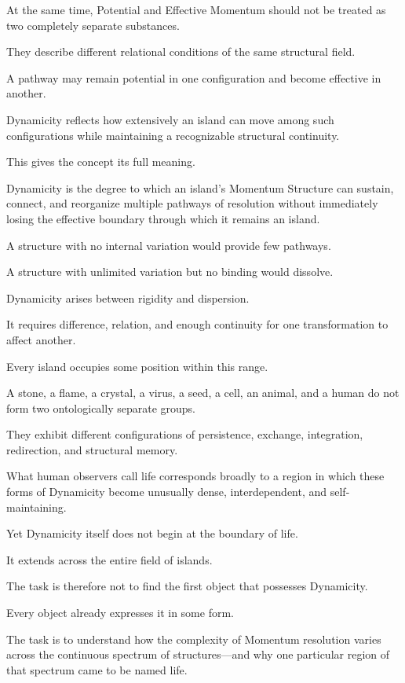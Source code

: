 At the same time, Potential and Effective Momentum should not be treated as two completely separate substances.

They describe different relational conditions of the same structural field.

A pathway may remain potential in one configuration and become effective in another.

Dynamicity reflects how extensively an island can move among such configurations while maintaining a recognizable structural continuity.

This gives the concept its full meaning.

Dynamicity is the degree to which an island’s Momentum Structure can sustain, connect, and reorganize multiple pathways of resolution without immediately losing the effective boundary through which it remains an island.

A structure with no internal variation would provide few pathways.

A structure with unlimited variation but no binding would dissolve.

Dynamicity arises between rigidity and dispersion.

It requires difference, relation, and enough continuity for one transformation to affect another.

Every island occupies some position within this range.

A stone, a flame, a crystal, a virus, a seed, a cell, an animal, and a human do not form two ontologically separate groups.

They exhibit different configurations of persistence, exchange, integration, redirection, and structural memory.

What human observers call life corresponds broadly to a region in which these forms of Dynamicity become unusually dense, interdependent, and self-maintaining.

Yet Dynamicity itself does not begin at the boundary of life.

It extends across the entire field of islands.

The task is therefore not to find the first object that possesses Dynamicity.

Every object already expresses it in some form.

The task is to understand how the complexity of Momentum resolution varies across the continuous spectrum of structures—and why one particular region of that spectrum came to be named life.


